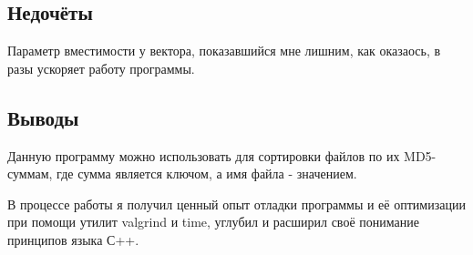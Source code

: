 \documentclass[12pt]{article}
\begin{document}

\subsection*{Недочёты}

Параметр вместимости у вектора, показавшийся мне лишним, как оказаось, в разы ускоряет работу программы.

\subsection*{Выводы}

Данную программу можно использовать для сортировки файлов по их MD5-суммам, где сумма является ключом, а имя файла - значением.

В процессе работы я получил ценный опыт отладки программы и её оптимизации при помощи утилит valgrind и time, углубил и расширил своё понимание принципов языка С++.
\end{document}
